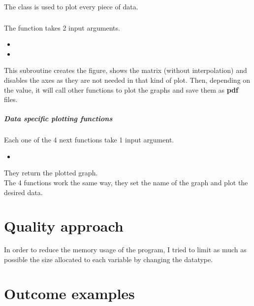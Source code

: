 \subsection{}
The class is used to plot every piece of data.

\subsubsection{\textcolor{func}{}}
The function  takes 2 input arguments.
\begin{itemize}
      \item {}
      \item {}
\end{itemize}
This subroutine creates the figure, shows the matrix  (without
interpolation) and disables the axes as they are not needed in that kind of
plot. Then, depending on the  value, it will call other 
functions to plot the graphs and save them as \textbf{pdf} files.

\subsubsection{Data specific plotting functions}
Each one of the 4 next functions take 1 input argument.
\begin{itemize}
      \item {}
\end{itemize}
They return the plotted graph.\\
The 4 functions work the same way, they set the name of the graph and plot the
desired data.

\newpage
\part{Quality approach}
In order to reduce the memory usage of the program, I tried to limit as much
as possible the size allocated to each variable by changing the datatype.
\newpage
\part{Outcome examples}
